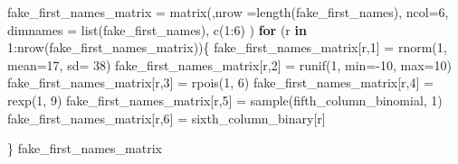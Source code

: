 \documentclass[
]{article}
\newenvironment{Shaded}{\begin{snugshade}}{\end{snugshade}}
\newcommand{\AttributeTok}[1]{\textcolor[rgb]{0.77,0.63,0.00}{#1}}
\newcommand{\ControlFlowTok}[1]{\textcolor[rgb]{0.13,0.29,0.53}{\textbf{#1}}}
\newcommand{\DecValTok}[1]{\textcolor[rgb]{0.00,0.00,0.81}{#1}}
\newcommand{\FunctionTok}[1]{\textcolor[rgb]{0.00,0.00,0.00}{#1}}
\newcommand{\NormalTok}[1]{#1}
\newcommand{\OtherTok}[1]{\textcolor[rgb]{0.56,0.35,0.01}{#1}}
\newcommand{\SpecialCharTok}[1]{\textcolor[rgb]{0.00,0.00,0.00}{#1}}
\begin{document}
\begin{Shaded}
\begin{Highlighting}[]
\NormalTok{fake\_first\_names\_matrix }\OtherTok{=} \FunctionTok{matrix}\NormalTok{(,}\AttributeTok{nrow =}\FunctionTok{length}\NormalTok{(fake\_first\_names), }\AttributeTok{ncol=}\DecValTok{6}\NormalTok{, }\AttributeTok{dimnames =} \FunctionTok{list}\NormalTok{(fake\_first\_names), }\FunctionTok{c}\NormalTok{(}\DecValTok{1}\SpecialCharTok{:}\DecValTok{6}\NormalTok{) )}
\ControlFlowTok{for}\NormalTok{ (r }\ControlFlowTok{in} \DecValTok{1}\SpecialCharTok{:}\FunctionTok{nrow}\NormalTok{(fake\_first\_names\_matrix))\{}
\NormalTok{    fake\_first\_names\_matrix[r,}\DecValTok{1}\NormalTok{] }\OtherTok{=} \FunctionTok{rnorm}\NormalTok{(}\DecValTok{1}\NormalTok{, }\AttributeTok{mean=}\DecValTok{17}\NormalTok{, }\AttributeTok{sd=} \DecValTok{38}\NormalTok{)}
\NormalTok{    fake\_first\_names\_matrix[r,}\DecValTok{2}\NormalTok{] }\OtherTok{=} \FunctionTok{runif}\NormalTok{(}\DecValTok{1}\NormalTok{, }\AttributeTok{min=}\SpecialCharTok{{-}}\DecValTok{10}\NormalTok{, }\AttributeTok{max=}\DecValTok{10}\NormalTok{)}
\NormalTok{    fake\_first\_names\_matrix[r,}\DecValTok{3}\NormalTok{] }\OtherTok{=} \FunctionTok{rpois}\NormalTok{(}\DecValTok{1}\NormalTok{, }\DecValTok{6}\NormalTok{)}
\NormalTok{    fake\_first\_names\_matrix[r,}\DecValTok{4}\NormalTok{] }\OtherTok{=} \FunctionTok{rexp}\NormalTok{(}\DecValTok{1}\NormalTok{, }\DecValTok{9}\NormalTok{)}
\NormalTok{    fake\_first\_names\_matrix[r,}\DecValTok{5}\NormalTok{] }\OtherTok{=} \FunctionTok{sample}\NormalTok{(fifth\_column\_binomial, }\DecValTok{1}\NormalTok{)}
\NormalTok{    fake\_first\_names\_matrix[r,}\DecValTok{6}\NormalTok{] }\OtherTok{=}\NormalTok{ sixth\_column\_binary[r]}
    
\NormalTok{\}}
\NormalTok{fake\_first\_names\_matrix}
\end{Highlighting}
\end{Shaded}
\end{document}
